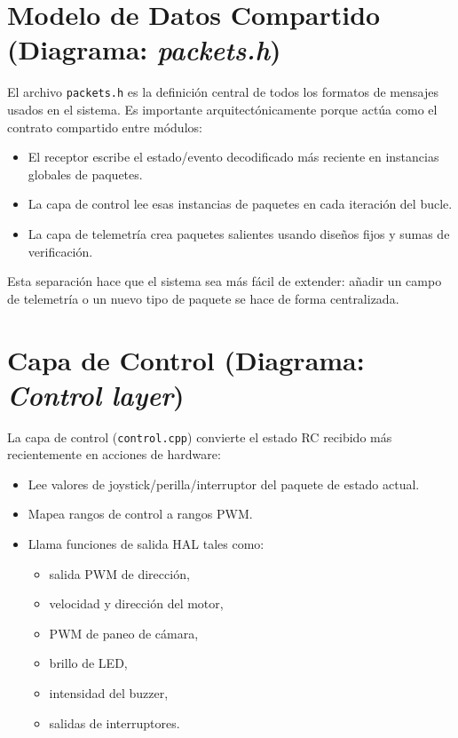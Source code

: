 \section{Modelo de Datos Compartido (Diagrama: \textit{packets.h})}

El archivo \texttt{packets.h} es la definición central de todos los formatos de mensajes usados en el sistema.
Es importante arquitectónicamente porque actúa como el contrato compartido entre módulos:

\begin{itemize}
    \item El receptor escribe el estado/evento decodificado más reciente en instancias globales de paquetes.
    \item La capa de control lee esas instancias de paquetes en cada iteración del bucle.
    \item La capa de telemetría crea paquetes salientes usando diseños fijos y sumas de verificación.
\end{itemize}

Esta separación hace que el sistema sea más fácil de extender: añadir un campo de telemetría o un nuevo tipo de paquete se hace de forma centralizada.

\section{Capa de Control (Diagrama: \textit{Control layer})}

La capa de control (\texttt{control.cpp}) convierte el estado RC recibido más recientemente en acciones de hardware:

\begin{itemize}
    \item Lee valores de joystick/perilla/interruptor del paquete de estado actual.
    \item Mapea rangos de control a rangos PWM.
    \item Llama funciones de salida HAL tales como:
    \begin{itemize}
        \item salida PWM de dirección,
        \item velocidad y dirección del motor,
        \item PWM de paneo de cámara,
        \item brillo de LED,
        \item intensidad del buzzer,
        \item salidas de interruptores.
    \end{itemize}
\end{itemize}

